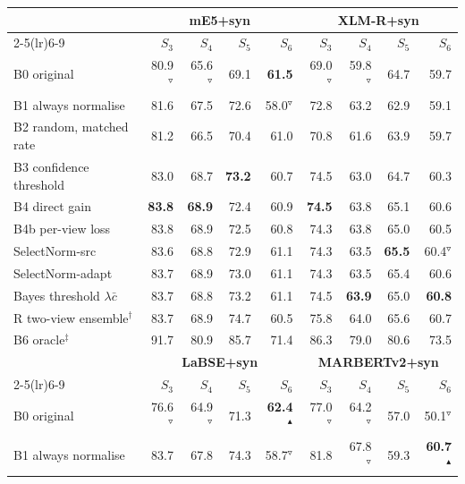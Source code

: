 \begin{tabular}{@{}lrrrrrrrr@{}}\toprule
 & \multicolumn{4}{c}{\textbf{mE5+syn}} & \multicolumn{4}{c}{\textbf{XLM-R+syn}}\\
\cmidrule(lr){2-5}\cmidrule(lr){6-9}
 & $S_3$ & $S_4$ & $S_5$ & $S_6$ & $S_3$ & $S_4$ & $S_5$ & $S_6$\\\midrule
B0 original & 80.9$^{\triangledown}$ & 65.6$^{\triangledown}$ & 69.1 & \textbf{61.5} & 69.0$^{\triangledown}$ & 59.8$^{\triangledown}$ & 64.7 & 59.7\\
B1 always normalise & 81.6 & 67.5 & 72.6 & 58.0$^{\triangledown}$ & 72.8 & 63.2 & 62.9 & 59.1\\
B2 random, matched rate & 81.2 & 66.5 & 70.4 & 61.0 & 70.8 & 61.6 & 63.9 & 59.7\\
B3 confidence threshold & 83.0 & 68.7 & \textbf{73.2} & 60.7 & 74.5 & 63.0 & 64.7 & 60.3\\
B4 direct gain & \textbf{83.8} & \textbf{68.9} & 72.4 & 60.9 & \textbf{74.5} & 63.8 & 65.1 & 60.6\\
B4b per-view loss & 83.8 & 68.9 & 72.5 & 60.8 & 74.3 & 63.8 & 65.0 & 60.5\\
SelectNorm-src & 83.6 & 68.8 & 72.9 & 61.1 & 74.3 & 63.5 & \textbf{65.5} & 60.4$^{\triangledown}$\\
\rowcolor{black!6}SelectNorm-adapt & 83.7 & 68.9 & 73.0 & 61.1 & 74.3 & 63.5 & 65.4 & 60.6\\
\quad Bayes threshold $\lambda\bar c$ & 83.7 & 68.8 & 73.2 & 61.1 & 74.5 & \textbf{63.9} & 65.0 & \textbf{60.8}\\
\addlinespace[2pt]
R two-view ensemble$^\dagger$ & 83.7 & 68.9 & 74.7 & 60.5 & 75.8 & 64.0 & 65.6 & 60.7\\
B6 oracle$^\ddagger$ & 91.7 & 80.9 & 85.7 & 71.4 & 86.3 & 79.0 & 80.6 & 73.5\\
\midrule[\heavyrulewidth]
 & \multicolumn{4}{c}{\textbf{LaBSE+syn}} & \multicolumn{4}{c}{\textbf{MARBERTv2+syn}}\\
\cmidrule(lr){2-5}\cmidrule(lr){6-9}
 & $S_3$ & $S_4$ & $S_5$ & $S_6$ & $S_3$ & $S_4$ & $S_5$ & $S_6$\\\midrule
B0 original & 76.6$^{\triangledown}$ & 64.9$^{\triangledown}$ & 71.3 & \textbf{62.4}$^{\blacktriangle}$ & 77.0$^{\triangledown}$ & 64.2$^{\triangledown}$ & 57.0 & 50.1$^{\triangledown}$\\
B1 always normalise & 83.7 & 67.8 & 74.3 & 58.7$^{\triangledown}$ & 81.8 & 67.8$^{\triangledown}$ & 59.3 & \textbf{60.7}$^{\blacktriangle}$\\

\end{tabular}

